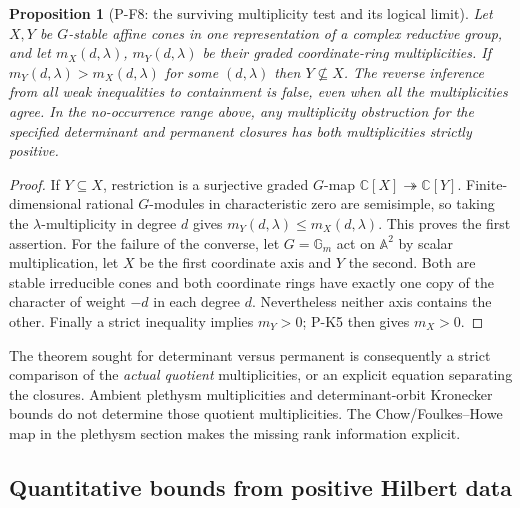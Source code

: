 \documentclass[11pt,a4paper]{article}
\newtheorem{proposition}{Proposition}[section]
\begin{document}
\begin{proposition}[P-F8: the surviving multiplicity test and its logical limit]
\label{prop:multiplicity}
Let $X,Y$ be $G$-stable affine cones in one representation of a complex
reductive group, and let $m_X(d,\lambda)$, $m_Y(d,\lambda)$ be their
graded coordinate-ring multiplicities. If
$m_Y(d,\lambda)>m_X(d,\lambda)$ for some $(d,\lambda)$ then
$Y\not\subseteq X$. The reverse inference from all weak inequalities
to containment is false, even when all the multiplicities agree.
In the no-occurrence range above, any multiplicity obstruction for the
specified determinant and permanent closures has both multiplicities
strictly positive.
\end{proposition}
\begin{proof}
If $Y\subseteq X$, restriction is a surjective graded $G$-map
$\mathbb C[X]\twoheadrightarrow\mathbb C[Y]$.
Finite-dimensional rational $G$-modules in characteristic zero are
semisimple, so taking the $\lambda$-multiplicity in degree $d$ gives
$m_Y(d,\lambda)\le m_X(d,\lambda)$. This proves the first assertion.
For the failure of the converse, let $G=\mathbb G_m$ act on
$\mathbb A^2$ by scalar multiplication, let $X$ be the first coordinate
axis and $Y$ the second. Both are stable irreducible cones and both
coordinate rings have exactly one copy of the character of weight
$-d$ in each degree $d$. Nevertheless neither axis contains the other.
Finally a strict inequality implies $m_Y>0$; P-K5 then gives $m_X>0$.
\end{proof}

The theorem sought for determinant versus permanent is consequently
a strict comparison of the \emph{actual quotient} multiplicities, or
an explicit equation separating the closures. Ambient plethysm
multiplicities and determinant-orbit Kronecker bounds do not determine
those quotient multiplicities. The Chow/Foulkes--Howe map in the
plethysm section makes the missing rank information explicit.



\subsection{Quantitative bounds from positive Hilbert data}
\end{document}
